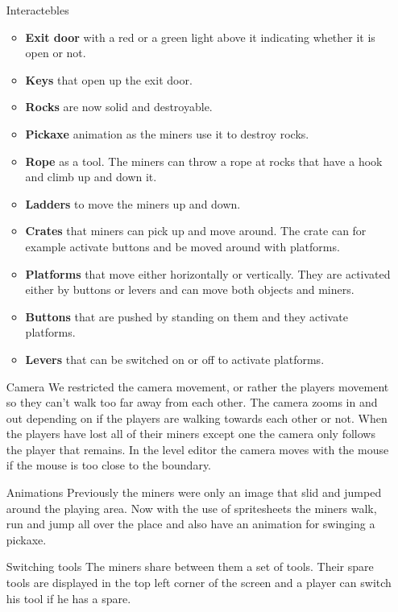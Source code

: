 \begin{itemize}
    \item[Interactebles]
    \begin{itemize}[label={}]
        \item \textbf{Exit door} with a red or a green light above it indicating whether it is open or not. 
        \item \textbf{Keys} that open up the exit door.
        \item \textbf{Rocks} are now solid and destroyable.
        \item \textbf{Pickaxe} animation as the miners use it to destroy rocks.
        \item \textbf{Rope} as a tool. The miners can throw a rope at rocks that have a hook and climb up and down it.
        \item \textbf{Ladders} to move the miners up and down.
        \item \textbf{Crates} that miners can pick up and move around. The crate can for example activate buttons and be moved around with platforms.
        \item \textbf{Platforms} that move either horizontally or vertically. They are activated either by buttons or levers and can move both objects and miners.
        \item \textbf{Buttons} that are pushed by standing on them and they activate platforms.
        \item \textbf{Levers} that can be switched on or off to activate platforms.
    \end{itemize}
    
    \item[Camera] 
    We restricted the camera movement, or rather the players movement so they can't walk too far away from each other. The camera zooms in and out depending on if the players are walking towards each other or not. When the players have lost all of their miners except one the camera only follows the player that remains. In the level editor the camera moves with the mouse if the mouse is too close to the boundary.
    
    \item[Animations]
    Previously the miners were only an image that slid and jumped around the playing area. Now with the use of spritesheets the miners walk, run and jump all over the place and also have an animation for swinging a pickaxe.
    
    \item[Switching tools]
    The miners share between them a set of tools. Their spare tools are displayed in the top left corner of the screen and a player can switch his tool if he has a spare.
    

\end{itemize}
